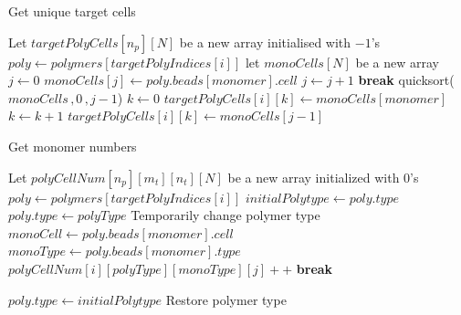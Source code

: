 \documentclass[bachelor,       %
               twoside,        %
               BCOR10mm,       %
               ngerman, english %
               ]{GAUBM}
\begin{document}
\begin{algorithm}
\caption{Get unique target cells}\label{alg:get_cell_indices}
\begin{algorithmic}[1]
\State Let $targetPolyCells[n_p][N]$ be a new array initialised with $-1$'s
    \State $poly \gets polymers[targetPolyIndices[i]]$
    \State let $monoCells[N]$ be a new array
    \State $j\gets 0$
            \State $monoCells[j]\gets poly.beads[monomer].cell$
            \State $j\gets j+1$
            \State \textbf{break}
        \EndIf
    \EndFor
    \State quicksort($monoCells\,,0\,,j-1$)
    \State $k\gets 0$
            \State $targetPolyCells[i][k]\gets monoCells[monomer]$
            \State $k\gets k+1$
        \EndIf
    \EndFor
    \State $targetPolyCells[i][k]\gets monoCells[j-1]$
\EndFor
\end{algorithmic}
\end{algorithm}



\begin{algorithm}
\caption{Get monomer numbers}\label{alg:get_cell_numbers}
\begin{algorithmic}[1]
\State Let $polyCellNum[n_p][m_t][n_t][N]$ be a new array initialized with $0$'s
    \State $poly \gets polymers[targetPolyIndices[i]]$
    \State $initialPolytype\gets poly.type$
        \State $poly.type\gets polyType$
        \Comment Temporarily change polymer type
            \State $monoCell\gets poly.beads[monomer].cell$
            \State $monoType\gets poly.beads[monomer].type$
                \State $polyCellNum[i][polyType][monoType][j]++$ 
                \State \textbf{break}
            \EndIf
            \EndFor
        \EndFor
    \EndFor
    
    \State $poly.type\gets initialPolytype$
    \Comment Restore polymer type
\EndFor
\end{algorithmic}
\end{algorithm}
\end{document}
